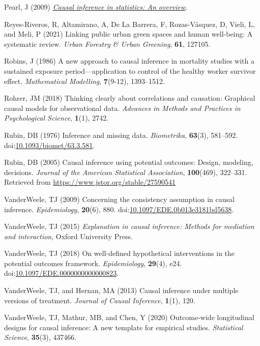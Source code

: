 \documentclass[
  singlecolumn]{article}
\newlength{\cslhangindent}
\newenvironment{CSLReferences}[2] %
 {\begin{list}{}{%
  \setlength{\itemindent}{0pt}
  \setlength{\leftmargin}{0pt}
  \setlength{\parsep}{0pt}
  \ifodd #1
   \setlength{\leftmargin}{\cslhangindent}
   \setlength{\itemindent}{-1\cslhangindent}
  \fi
  \setlength{\itemsep}{#2\baselineskip}}}
 {\end{list}}
\begin{document}
\begin{CSLReferences}{1}{0}
Pearl, J (2009) \emph{\href{https://doi.org/10.1214/09-SS057}{Causal
inference in statistics: An overview}}.

Reyes-Riveros, R, Altamirano, A, De La Barrera, F, Rozas-Vásquez, D,
Vieli, L, and Meli, P (2021) Linking public urban green spaces and human
well-being: A systematic review. \emph{Urban Forestry \& Urban
Greening}, \textbf{61}, 127105.

Robins, J (1986) A new approach to causal inference in mortality studies
with a sustained exposure period---application to control of the healthy
worker survivor effect. \emph{Mathematical Modelling}, \textbf{7}(9-12),
1393--1512.

Rohrer, JM (2018) Thinking clearly about correlations and causation:
Graphical causal models for observational data. \emph{Advances in
Methods and Practices in Psychological Science}, \textbf{1}(1), 2742.

Rubin, DB (1976) Inference and missing data. \emph{Biometrika},
\textbf{63}(3), 581--592.
doi:\href{https://doi.org/10.1093/biomet/63.3.581}{10.1093/biomet/63.3.581}.

Rubin, DB (2005) Causal inference using potential outcomes: Design,
modeling, decisions. \emph{Journal of the American Statistical
Association}, \textbf{100}(469), 322--331. Retrieved from
\url{https://www.jstor.org/stable/27590541}

VanderWeele, TJ (2009) Concerning the consistency assumption in causal
inference. \emph{Epidemiology}, \textbf{20}(6), 880.
doi:\href{https://doi.org/10.1097/EDE.0b013e3181bd5638}{10.1097/EDE.0b013e3181bd5638}.

VanderWeele, TJ (2015) \emph{Explanation in causal inference: Methods
for mediation and interaction}, Oxford University Press.

VanderWeele, TJ (2018) On well-defined hypothetical interventions in the
potential outcomes framework. \emph{Epidemiology}, \textbf{29}(4), e24.
doi:\href{https://doi.org/10.1097/EDE.0000000000000823}{10.1097/EDE.0000000000000823}.

VanderWeele, TJ, and Hernan, MA (2013) Causal inference under multiple
versions of treatment. \emph{Journal of Causal Inference},
\textbf{1}(1), 120.

VanderWeele, TJ, Mathur, MB, and Chen, Y (2020) Outcome-wide
longitudinal designs for causal inference: A new template for empirical
studies. \emph{Statistical Science}, \textbf{35}(3), 437466.

\end{CSLReferences}
\end{document}
